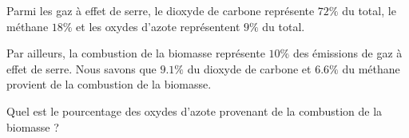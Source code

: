 
\begin{exercice}\label{exoSeconde-0026}

    Parmi les gaz à effet de serre, le dioxyde de carbone représente \( 72\%\) du total, le méthane \( 18\%\) et les oxydes d'azote représentent \( 9\%\) du total.

    Par ailleurs, la combustion de la biomasse représente \( 10\%\) des émissions de gaz à effet de serre. Nous savons que \( 9.1\%\) du dioxyde de carbone et \( 6.6\%\) du méthane provient de la combustion de la biomasse. 

    Quel est le pourcentage des oxydes d'azote provenant de la combustion de la biomasse ?

\end{exercice}
